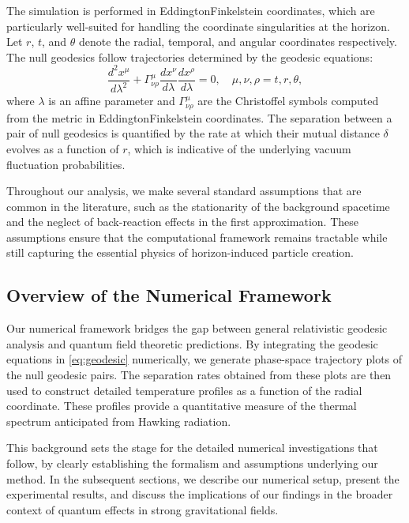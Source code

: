 \documentclass{article}\usepackage[utf8]{inputenc} %
\begin{document}
The simulation is performed in Eddington\textendash Finkelstein coordinates, which are particularly well-suited for handling the coordinate singularities at the horizon. Let $r$, $t$, and $\theta$ denote the radial, temporal, and angular coordinates respectively. The null geodesics follow trajectories determined by the geodesic equations:
\begin{equation}
\frac{d^2 x^\mu}{d\lambda^2} + \Gamma^\mu_{\nu \rho}\frac{dx^\nu}{d\lambda}\frac{dx^\rho}{d\lambda} = 0, \quad \mu,\nu,\rho = t,r,\theta, \label{eq:geodesic}
\end{equation}
where $\lambda$ is an affine parameter and $\Gamma^\mu_{\nu \rho}$ are the Christoffel symbols computed from the metric in Eddington\textendash Finkelstein coordinates. The separation between a pair of null geodesics is quantified by the rate at which their mutual distance $\delta$ evolves as a function of $r$, which is indicative of the underlying vacuum fluctuation probabilities.

Throughout our analysis, we make several standard assumptions that are common in the literature, such as the stationarity of the background spacetime and the neglect of back-reaction effects in the first approximation. These assumptions ensure that the computational framework remains tractable while still capturing the essential physics of horizon-induced particle creation.

\subsection{Overview of the Numerical Framework}
Our numerical framework bridges the gap between general relativistic geodesic analysis and quantum field theoretic predictions. By integrating the geodesic equations in \eqref{eq:geodesic} numerically, we generate phase-space trajectory plots of the null geodesic pairs. The separation rates obtained from these plots are then used to construct detailed temperature profiles as a function of the radial coordinate. These profiles provide a quantitative measure of the thermal spectrum anticipated from Hawking radiation.

This background sets the stage for the detailed numerical investigations that follow, by clearly establishing the formalism and assumptions underlying our method. In the subsequent sections, we describe our numerical setup, present the experimental results, and discuss the implications of our findings in the broader context of quantum effects in strong gravitational fields.
\end{document}
